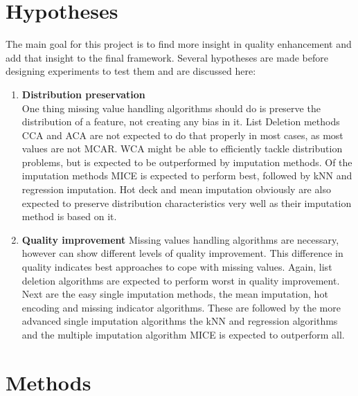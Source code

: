 \documentclass[10pt,a4paper]{article}
\begin{document}
	
	\section{Hypotheses}
	\label{sec:Hypothesis}
	
	The main goal for this project is to find more insight in quality enhancement and add that insight to the final framework. Several hypotheses are made before designing experiments to test them and are discussed here:
	
	\begin{enumerate}
		\item \textbf{Distribution preservation} \\
		One thing missing value handling algorithms should do is preserve the distribution of a feature, not creating any bias in it. List Deletion methods CCA and ACA are not expected to do that properly in most cases, as most values are not MCAR. WCA might be able to efficiently tackle distribution problems, but is expected to be outperformed by imputation methods. Of the imputation methods MICE is expected to perform best, followed by kNN and regression imputation. Hot deck and mean imputation obviously are also expected to preserve distribution characteristics very well as their imputation method is based on it.
		\item \textbf{Quality improvement}
		Missing values handling algorithms are necessary, however can show different levels of quality improvement. This difference in quality indicates best approaches to cope with missing values. Again, list deletion algorithms are expected to perform worst in quality improvement. Next are the easy single imputation methods, the mean imputation, hot encoding and missing indicator algorithms. These are followed by the more advanced single imputation algorithms the kNN and regression algorithms and the multiple imputation algorithm MICE is expected to outperform all.
	\end{enumerate}
	
	\section{Methods}
	\label{sec:Methods}
	
\end{document}
